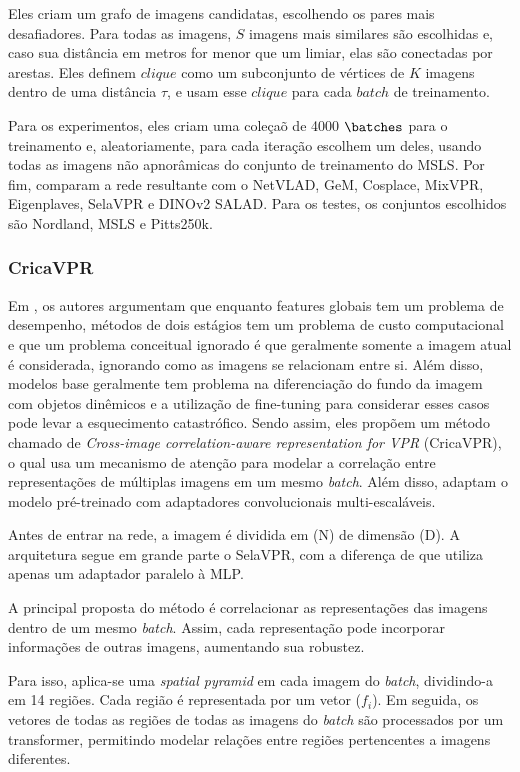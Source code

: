 \documentclass[letterpaper, 10 pt, conference]{ieeeconf}  %
\begin{document}
Eles criam um grafo de imagens candidatas, escolhendo os pares mais desafiadores. Para todas as imagens, $S$ imagens mais similares são escolhidas e, caso sua distância em metros for menor que um limiar, elas são conectadas por arestas. Eles definem $clique$ como um subconjunto de vértices de $K$ imagens dentro de uma distância $\tau$, e usam esse $clique$ para cada $batch$ de treinamento.

Para os experimentos, eles criam uma coleçaõ de 4000 $\batches$ para o treinamento e, aleatoriamente, para cada iteração escolhem um deles, usando todas as imagens não apnorâmicas do conjunto de treinamento do MSLS. Por fim, comparam a rede resultante com o NetVLAD, GeM, Cosplace, MixVPR, Eigenplaves, SelaVPR e DINOv2 SALAD. Para os testes, os conjuntos escolhidos são Nordland, MSLS e Pitts250k.

\subsubsection{CricaVPR}

Em \cite{crica}, os autores argumentam que enquanto features globais tem um problema de desempenho, métodos de dois estágios tem um problema de custo computacional e que um problema conceitual ignorado é que geralmente somente a imagem atual é considerada, ignorando como as imagens se relacionam entre si. Além disso, modelos base geralmente tem problema na diferenciação do fundo da imagem com objetos dinêmicos e a utilização de fine-tuning para considerar esses casos pode levar a esquecimento catastrófico. Sendo assim, eles propõem um método chamado de \textit{Cross-image correlation-aware representation for VPR} (CricaVPR), o qual usa um mecanismo de atenção para modelar a correlação entre representações de múltiplas imagens em um mesmo \textit{batch}. Além disso, adaptam o modelo pré-treinado com adaptadores convolucionais multi-escaláveis.

Antes de entrar na rede, a imagem é dividida em (N)  de dimensão (D). A arquitetura segue em grande parte o SelaVPR, com a diferença de que utiliza apenas um adaptador paralelo à MLP.

A principal proposta do método é correlacionar as representações das imagens dentro de um mesmo \textit{batch}. Assim, cada representação pode incorporar informações de outras imagens, aumentando sua robustez.

Para isso, aplica-se uma \textit{spatial pyramid} em cada imagem do \textit{batch}, dividindo-a em 14 regiões. Cada região é representada por um vetor ($f_i$). Em seguida, os vetores de todas as regiões de todas as imagens do \textit{batch} são processados por um transformer, permitindo modelar relações entre regiões pertencentes a imagens diferentes.
\end{document}
